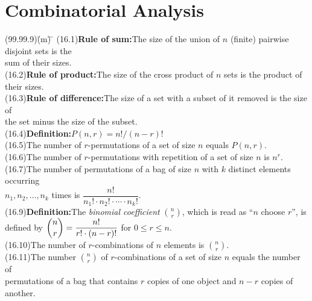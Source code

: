 \documentclass{amsart}
\newcommand{\lgap}{2pt}                             %
\newcommand{\llgap}{6pt}                            %
\begin{document}
\section*{Combinatorial Analysis}
\begin{tabbing}
(99.99.9)\;\=(m)\;\= \makebox[2in]{ } \= \kill
(16.1)\>\textbf{Rule of sum:}\quad The size of the union of $n$ (finite) pairwise disjoint sets is the\\[\lgap]
      \>sum of their sizes.\\[\llgap]
(16.2)\>\textbf{Rule of product:}\quad The size of the cross product of $n$ sets is the product of\\[\lgap]
      \>their sizes.\\[\llgap]
(16.3)\>\textbf{Rule of difference:}\quad The size of a set with a subset of it removed is the size of\\[\lgap]
      \>the set minus the size of the subset.\\[\llgap]
(16.4)\>\textbf{Definition:}\quad $P(n,r)=n!/(n-r)!$\\[\lgap]
(16.5)\>The number of $r$-permutations of a set of size $n$ equals $P(n,r)$.\\[\lgap]
(16.6)\>The number of $r$-permutations with repetition of a set of size $n$ is $n^{r}$.\\[\lgap]
(16.7)\>The number of permutations of a bag of size $n$ with $k$ distinct elements occurring\\[\lgap]
      \>$n_{1},n_{2}, \ldots ,n_{k}$ times is $\dfrac{n!}{n_{1}!\cdot n_{2}!\cdot \cdots \cdot n_{k}!}$.\\[\llgap]
(16.9)\>\textbf{Definition:}\quad The \emph{binomial coefficient} $\binom{n}{r}$, which is read as ``$n$ choose $r$'', is\\[\lgap]
      \>defined by \quad $\dbinom{n}{r} = \dfrac{n!}{r!\cdot (n-r)!}$ \quad for $0\le r \le n$.\\[\llgap]
(16.10)\>The number of $r$-combinations of $n$ elements is $\binom{n}{r}$.\\[\llgap]
(16.11)\>The number $\binom{n}{r}$ of $r$-combinations of a set of size $n$ equals the number of\\[\lgap]
       \>permutations of a bag that contains $r$ copies of one object and $n-r$ copies of\\[\lgap]
       \>another.\\[\lgap]
\end{tabbing}
\end{document}
